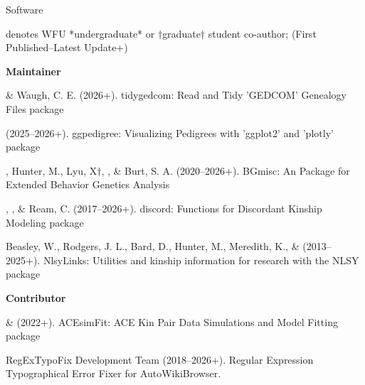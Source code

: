 \begin{rSection}{\textrm{Software}}%
\vspace{-1mm}\begin{center}\footnotesize{denotes WFU *undergraduate* or $\dagger$graduate$\dagger$ student co-author; (First Published–Latest Update+)}\end{center}\vspace{-4mm}
{\large \textbf {Maintainer}}%
\begin{etaremune}
\item \meb \& Waugh, C. E. (2026+). tidygedcom: Read and Tidy 'GEDCOM' Genealogy Files \R package %
\item \meb (2025–2026+). ggpedigree: Visualizing Pedigrees with 'ggplot2' and 'plotly' \R package %
\item\meb, Hunter, M., Lyu, X$\dagger$, \jt, \& Burt, S. A. (2020–2026+). BGmisc: An \R Package  for Extended Behavior Genetics Analysis %
\item\meb, \jt, \& Ream, C. (2017–2026+). discord: Functions for Discordant Kinship Modeling \R package 
\item  Beasley, W., Rodgers, J. L., Bard, D., Hunter, M., Meredith, K., \& \meb  (2013–2025+). NlsyLinks: Utilities and kinship information for research with the NLSY \R package 

%
%
\smallskip
\hspace*{-8mm}\large{\bf{Contributor}}
\item \xyl  \& \meb (2022+). ACEsimFit: ACE Kin Pair Data Simulations and Model Fitting \R package 


\item RegExTypoFix Development Team (2018–2026+). Regular Expression Typographical Error Fixer for Auto\allowbreak WikiBrowser. 
%
%
%
\end{etaremune}
\end{rSection}
